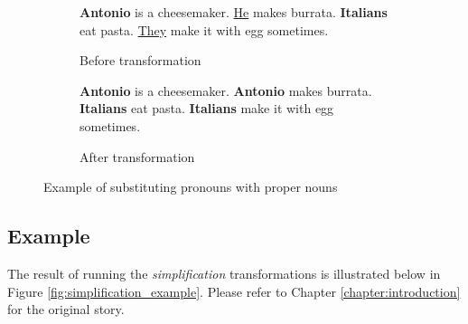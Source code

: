 \begin{figure}[H]
\begin{subfigure}{\textwidth}
\begin{displayquote}
\textbf{Antonio} is a cheesemaker. \underline{He} makes burrata.
\textbf{Italians} eat pasta. \underline{They} make it with egg sometimes.
\end{displayquote}
\caption{Before transformation}
\vspace{\baselineskip}
\end{subfigure}
\begin{subfigure}{\textwidth}
\begin{displayquote}
\textbf{Antonio} is a cheesemaker. \textbf{Antonio} makes burrata.
\textbf{Italians} eat pasta. \textbf{Italians} make it with egg sometimes.
\caption{After transformation}
\end{displayquote}
\end{subfigure}
\caption{Example of substituting pronouns with proper nouns}
\label{fig:pronoun_substitution}
\end{figure}

\subsection{Example}
\label{subsec:simplification_example}

The result of running the \textit{simplification} transformations is illustrated below in Figure \ref{fig:simplification_example}. Please refer to Chapter \ref{chapter:introduction} for the original story.


